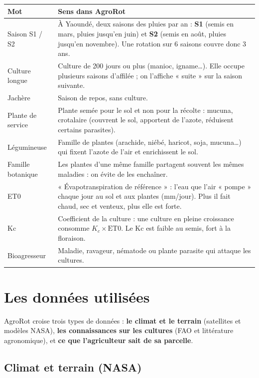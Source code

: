 \documentclass[11pt,a4paper]{article}
\begin{document}
\begin{center}
\begin{tabularx}{\textwidth}{L{3.6cm}Y}
\toprule
\textbf{Mot} & \textbf{Sens dans AgroRot} \\
\midrule
Saison S1 / S2 & À Yaoundé, deux saisons des pluies par an : \textbf{S1} (semis en mars, pluies jusqu'en juin) et \textbf{S2} (semis en août, pluies jusqu'en novembre). Une rotation sur 6 saisons couvre donc 3 ans. \\
Culture longue & Culture de 200 jours ou plus (manioc, igname…). Elle occupe plusieurs saisons d'affilée ; on l'affiche « suite » sur la saison suivante. \\
Jachère & Saison de repos, sans culture. \\
Plante de service & Plante semée pour le sol et non pour la récolte : mucuna, crotalaire (couvrent le sol, apportent de l'azote, réduisent certains parasites). \\
Légumineuse & Famille de plantes (arachide, niébé, haricot, soja, mucuna…) qui fixent l'azote de l'air et enrichissent le sol. \\
Famille botanique & Les plantes d'une même famille partagent souvent les mêmes maladies : on évite de les enchaîner. \\
ET0 & « Évapotranspiration de référence » : l'eau que l'air « pompe » chaque jour au sol et aux plantes (mm/jour). Plus il fait chaud, sec et venteux, plus elle est forte. \\
Kc & Coefficient de la culture : une culture en pleine croissance consomme \(K_c \times \text{ET0}\). Le Kc est faible au semis, fort à la floraison. \\
Bioagresseur & Maladie, ravageur, nématode ou plante parasite qui attaque les cultures. \\
\bottomrule
\end{tabularx}
\end{center}

\section{Les données utilisées}

AgroRot croise trois types de données : \textbf{le climat et le terrain} (satellites et modèles NASA),
\textbf{les connaissances sur les cultures} (FAO et littérature agronomique), et \textbf{ce que l'agriculteur sait de sa parcelle}.

\subsection{Climat et terrain (NASA)}
\end{document}
